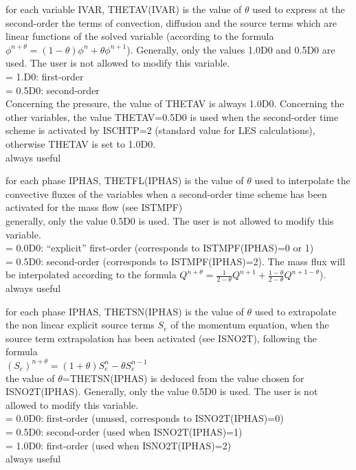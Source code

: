 {for each variable IVAR, THETAV(IVAR) is the value of $\theta$ used to
express at the second-order the terms of convection, diffusion and the
source terms which are linear functions of the solved variable
(according to the formula
$\phi^{n+\theta}=(1-\theta)\phi^n+\theta\phi^{n+1}$). Generally,
only the values 1.0D0 and 0.5D0 are used. The user is not allowed to modify
this variable.\\
\hspace*{1.3cm}= 1.D0: first-order \\
\hspace*{1.3cm}= 0.5D0: second-order \\
Concerning the pressure, the value of THETAV is always 1.0D0. Concerning
the other variables, the value THETAV=0.5D0 is used when the
second-order time scheme is activated by ISCHTP=2 (standard value for
LES calculations), otherwise THETAV is set to 1.0D0.\\
always useful}

{for each phase IPHAS, THETFL(IPHAS) is the value of $\theta$ used to
interpolate the convective fluxes of the variables when a second-order time
scheme has been activated for the mass flow (see ISTMPF)\\
generally, only the value 0.5D0 is used. The user is not allowed to
modify this variable.\\
\hspace*{1.3cm}= 0.0D0: ``explicit'' first-order (corresponds to
ISTMPF(IPHAS)=0 or 1)\\ 
\hspace*{1.3cm}= 0.5D0: second-order (corresponds to ISTMPF(IPHAS)=2). The mass
flux will be interpolated according to the formula
$Q^{n+\theta}=\frac{1}{2-\theta}Q^{n+1}+\frac{1-\theta}{2-\theta}Q^{n+1-\theta}$).\\
always useful}

{for each phase IPHAS, THETSN(IPHAS) is the value of $\theta$ used to
extrapolate the non linear explicit source terms $S_e$ of the momentum equation,
when the source term extrapolation has been activated (see ISNO2T),
following the formula\\
$(S_e)^{n+\theta}=(1+\theta)S_e^n-\theta S_e^{n-1}$\\
the value
of $\theta$=THETSN(IPHAS) is deduced from the value chosen for
ISNO2T(IPHAS). Generally, only the value 0.5D0 is used. The user is not
allowed to modify this variable.\\
\hspace*{1.3cm}= 0.0D0: first-order (unused, corresponds to ISNO2T(IPHAS)=0) \\
\hspace*{1.3cm}= 0.5D0: second-order (used when ISNO2T(IPHAS)=1) \\
\hspace*{1.3cm}= 1.0D0: first-order (used when ISNO2T(IPHAS)=2) \\
always useful}

